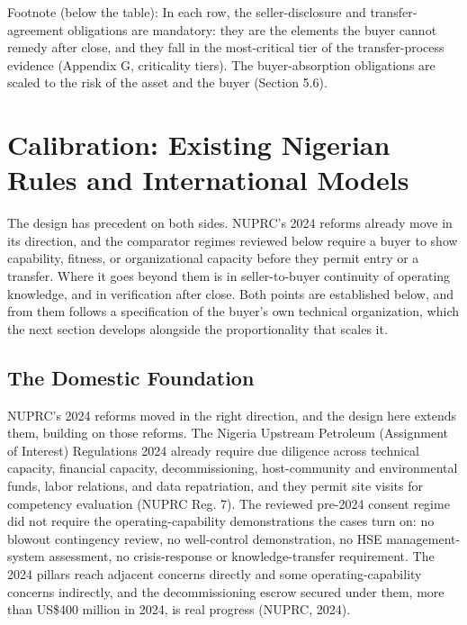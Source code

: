 Footnote (below the table): In each row, the seller-disclosure and
transfer-agreement obligations are mandatory: they are the elements the
buyer cannot remedy after close, and they fall in the most-critical tier
of the transfer-process evidence (Appendix G, criticality tiers). The
buyer-absorption obligations are scaled to the risk of the asset and the
buyer (Section 5.6).

\hypertarget{calibration-existing-nigerian-rules-and-international-models}{%
\section{Calibration: Existing Nigerian Rules and International
Models}\label{calibration-existing-nigerian-rules-and-international-models}}

The design has precedent on both sides. NUPRC's 2024 reforms already
move in its direction, and the comparator regimes reviewed below require
a buyer to show capability, fitness, or organizational capacity before
they permit entry or a transfer. Where it goes beyond them is in
seller-to-buyer continuity of operating knowledge, and in verification
after close. Both points are established below, and from them follows a
specification of the buyer's own technical organization, which the next
section develops alongside the proportionality that scales it.

\hypertarget{the-domestic-foundation}{%
\subsection{The Domestic Foundation}\label{the-domestic-foundation}}

NUPRC's 2024 reforms moved in the right direction, and the design here
extends them, building on those reforms. The Nigeria Upstream Petroleum
(Assignment of Interest) Regulations 2024 already require due diligence
across technical capacity, financial capacity, decommissioning,
host-community and environmental funds, labor relations, and data
repatriation, and they permit site visits for competency evaluation
(NUPRC Reg. 7). The reviewed pre-2024 consent regime did not require the
operating-capability demonstrations the cases turn on: no blowout
contingency review, no well-control demonstration, no HSE
management-system assessment, no crisis-response or knowledge-transfer
requirement. The 2024 pillars reach adjacent concerns directly and some
operating-capability concerns indirectly, and the decommissioning escrow
secured under them, more than US\$400 million in 2024, is real progress
(NUPRC, 2024).

